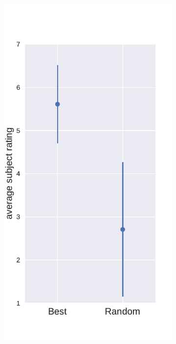\begin{figure}
	\centering
	\begin{subfigure}[b]{0.33\textwidth}
		\includegraphics[width=\textwidth, valign=t]{figures/best_vs_random_pv}
		\caption{}
		\label{fig:best_vs_random_pv}

\end{subfigure}
\end{figure}
